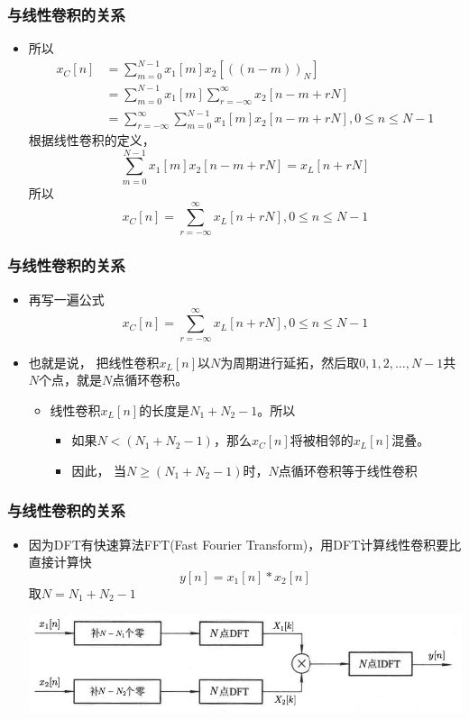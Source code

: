 \documentclass[CJKutf8,dvipsnames,table]{beamer}
\begin{document}
\begin{CJK*}{UTF8}{song}
  \begin{frame}
    \frametitle{与线性卷积的关系}
    \begin{itemize}
    \item 所以
    \begin{align*}
	    x_C[n] & = \sum_{m=0}^{N-1}x_1[m]x_2[((n-m))_N] 	\\    
	    & = \sum_{m=0}^{N-1}x_1[m]\sum_{r=-\infty}^{\infty} x_2[n-m+rN] \\
	    & = \sum_{r=-\infty}^{\infty} \sum_{m=0}^{N-1}x_1[m] x_2[n-m+rN], 0 \leq n \leq N-1 	    
    \end{align*}
    根据线性卷积的定义，
    \[
    \sum_{m=0}^{N-1}x_1[m] x_2[n-m+rN] = x_L[n+rN]
    \]
    所以
	\[
		x_C[n] = \sum_{r=-\infty}^{\infty} x_L[n+rN], 0 \leq n \leq N-1
	\]
	\end{itemize}
  \end{frame}   
  
  \begin{frame}
    \frametitle{与线性卷积的关系}
    \begin{itemize}
    \item 再写一遍公式
    \[
		x_C[n] = \sum_{r=-\infty}^{\infty} x_L[n+rN], 0 \leq n \leq N-1
	\]
    \item 也就是说，{\color{red} 把线性卷积$x_L[n]$以$N$为周期进行延拓，然后取$0, 1, 2, \hdots, N-1$共$N$个点，就是$N$点循环卷积。}
    	\begin{itemize}
    	\item 线性卷积$x_L[n]$的长度是$N_1+N_2-1$。所以
			\begin{itemize}
    		\item 如果$N < (N_1+N_2-1)$，那么$x_C[n]$将被相邻的$x_L[n]$混叠。
			\item 因此，{\color{red} 当$N \geq (N_1+N_2-1)$时，$N$点循环卷积等于线性卷积}
			\end{itemize}
    	\end{itemize}

	\end{itemize}
  \end{frame} 

  \begin{frame}
    \frametitle{与线性卷积的关系}
    \begin{itemize}
    \item 因为DFT有快速算法FFT(Fast Fourier Transform)，用DFT计算线性卷积要比直接计算快
	\[
		y[n] = x_1[n] \ast x_2[n]
	\]
	取$N=N_1+N_2-1$
    \begin{center}
      \includegraphics[scale=.37]{gxq-dsp-f3-4-1}
    \end{center}
	\end{itemize}
  \end{frame}   
  

\end{CJK*}
\end{document}
